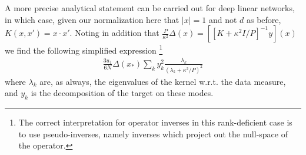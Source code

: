 
A more precise analytical statement can be carried out for deep linear networks, in which case, given our normalization here that $|x|=1$ and not $d$ as before, $K(x,x')=x \cdot x'$. Noting in addition that $\frac{P}{\kappa^2}\Delta(x)=[[K+\kappa^2 I/P]^{-1}y](x)$ we find the following simplified expression \footnote{The correct interpretation for operator inverses in this rank-deficient case is to use pseudo-inverses, namely inverses which project out the null-space of the operator.}
\begin{align}
\frac{3u_1}{6 N}\Delta(x_*) \sum_k y_k^2 \frac{\lambda_k}{(\lambda_k+\kappa^2/P)^2}
\end{align}
where $\lambda_k$ are, as always, the eigenvalues of the kernel w.r.t. the data measure, and $y_k$ is the decomposition of the target on these modes. 

